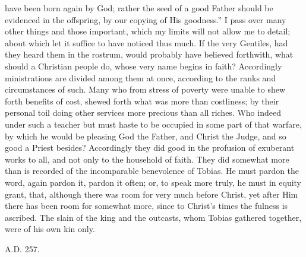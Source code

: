 have been born again by God; rather the seed of a good Father should
be evidenced in the offspring, by our copying of His goodness.'' I pass
over many other things and those important, which my limits will not
allow me to detail; about which let it suffice to have noticed thus much. If the very Gentiles, had they heard them in the rostrum, would
probably have believed forthwith, what should a Christian people do,
whose very name begins in faith? Accordingly ministrations are divided
among them at once, according to the ranks and circumstances of such.
Many who from stress of poverty were unable to shew forth benefits of
cost, shewed forth what was more than costliness; by their personal
toil doing other services more precious than all riches. Who indeed
under such a teacher but must haste to be occupied in some part of
that warfare, by which he would be pleasing God the Father, and Christ
the Judge, and so good a Priest besides? Accordingly they did good in
the profusion of exuberant works to all, and not only to the household
of faith. They did somewhat more than is recorded of the incomparable
benevolence of Tobias. He must pardon the word, again pardon it,
pardon it often; or, to speak more truly, he must in equity grant,
that, although there was room for very much before Christ, yet after
Him there has been room for somewhat more, since to Christ's times the
fulness is ascribed. The slain of the king and the outcasts, whom
Tobias gathered together, were of his own kin only.

A.D. 257.


